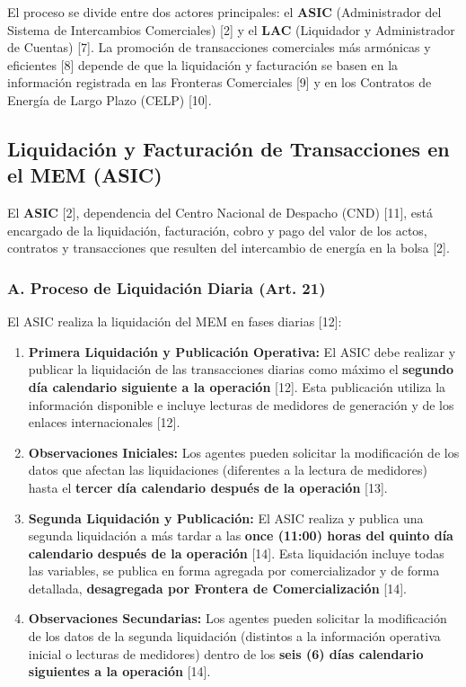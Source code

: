 \documentclass[a5paper]{book}%
\begin{document}
El proceso se divide entre dos actores principales: el \textbf{ASIC} (Administrador del Sistema de Intercambios Comerciales) [2] y el \textbf{LAC} (Liquidador y Administrador de Cuentas) [7]. La promoción de transacciones comerciales más armónicas y eficientes [8] depende de que la liquidación y facturación se basen en la información registrada en las Fronteras Comerciales [9] y en los Contratos de Energía de Largo Plazo (CELP) [10].

\subsection{Liquidación y Facturación de Transacciones en el MEM (ASIC)}

El \textbf{ASIC} [2], dependencia del Centro Nacional de Despacho (CND) [11], está encargado de la liquidación, facturación, cobro y pago del valor de los actos, contratos y transacciones que resulten del intercambio de energía en la bolsa [2].

\subsubsection*{A. Proceso de Liquidación Diaria (Art. 21)}
El ASIC realiza la liquidación del MEM en fases diarias [12]:

\begin{enumerate}
	\item \textbf{Primera Liquidación y Publicación Operativa:} El ASIC debe realizar y publicar la liquidación de las transacciones diarias como máximo el \textbf{segundo día calendario siguiente a la operación} [12]. Esta publicación utiliza la información disponible e incluye lecturas de medidores de generación y de los enlaces internacionales [12].
	\item \textbf{Observaciones Iniciales:} Los agentes pueden solicitar la modificación de los datos que afectan las liquidaciones (diferentes a la lectura de medidores) hasta el \textbf{tercer día calendario después de la operación} [13].
	\item \textbf{Segunda Liquidación y Publicación:} El ASIC realiza y publica una segunda liquidación a más tardar a las \textbf{once (11:00) horas del quinto día calendario después de la operación} [14]. Esta liquidación incluye todas las variables, se publica en forma agregada por comercializador y de forma detallada, \textbf{desagregada por Frontera de Comercialización} [14].
	\item \textbf{Observaciones Secundarias:} Los agentes pueden solicitar la modificación de los datos de la segunda liquidación (distintos a la información operativa inicial o lecturas de medidores) dentro de los \textbf{seis (6) días calendario siguientes a la operación} [14].
\end{enumerate}
\end{document}

